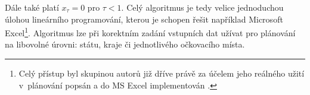%


Dále také platí $x_{\tau}=0$ pro $\tau<1$.
Celý algoritmus je tedy velice jednoduchou úlohou lineárního programování, kterou je schopen řešit například Microsoft Excel\footnote{Celý přístup byl skupinou autorů již dříve právě za účelem jeho reálného užití v~plánování popsán a do MS Excel implementován \cite{calc_blog}.}. Algoritmus lze při korektním zadání vstupních dat užívat pro plánování na libovolné úrovni: státu, kraje či jednotlivého očkovacího místa. 



